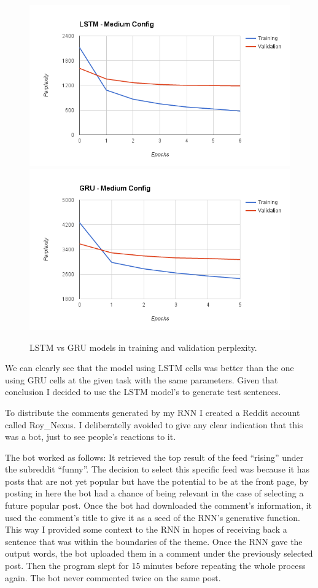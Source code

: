 \documentclass{article} %
\begin{document}
\begin{figure}[h]
\centering
\includegraphics[scale=0.5]{lstm_medium_config}
\includegraphics[scale=0.5]{gru_medium_config}
\caption{LSTM vs GRU models in training and validation perplexity.}
\label{fig:perplexity}
\end{figure}

We can clearly see that the model using LSTM cells was better than the one using
GRU cells at the given task with the same parameters. Given that conclusion I
decided to use the LSTM model's to generate test sentences.

To distribute the comments generated by my RNN I created a Reddit account called
Roy\_Nexus. I deliberatelly avoided to give any clear indication that this was
a bot, just to see people's reactions to it.

The bot worked as follows: It retrieved the top result of the feed ``rising''
under the subreddit ``funny''.  The decision to select this specific feed was
because it has posts that are not yet popular but have the potential to be at
the front page, by posting in here the bot had a chance of being relevant in the
case of selecting a future popular post. Once the bot had downloaded the
comment's information, it used the comment's title to give it as a seed of the
RNN's generative function. This way I provided some context to the RNN in hopes
of receiving back a sentence that was within the boundaries of the theme. Once
the RNN gave the output words, the bot uploaded them in a comment under the
previously selected post. Then the program slept for 15 minutes before repeating
the whole process again. The bot never commented twice on the same post.
\end{document}
